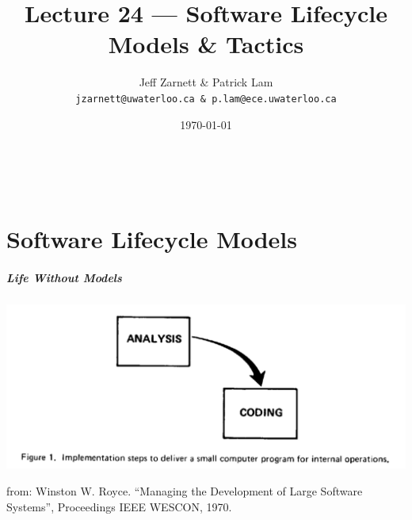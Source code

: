 

\title{Lecture 24 --- Software Lifecycle Models \& Tactics}

\author{Jeff Zarnett \& Patrick Lam \\ \small \texttt{jzarnett@uwaterloo.ca \& p.lam@ece.uwaterloo.ca}}
\date{\today}



\begin{frame}
  \titlepage

  \vfill
  \begin{center}
    \\
                  {\tiny\CcNote{\CcLongnameByNcSa}}
                  \vspace*{-2.5ex}
  \end{center}

\end{frame}

\part{Software Lifecycle Models}
\frame{\partpage}

\begin{frame}
\frametitle{Life Without Models}

\begin{center}
\includegraphics[height=.5\textheight]{images/two-stages.png}
\end{center}

from: Winston W. Royce. ``Managing the Development of Large Software Systems'', Proceedings IEEE WESCON, 1970.

\end{frame}

